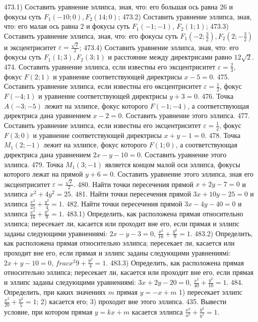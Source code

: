 473.1) Составить уравнение эллипса, зная, что: его большая ось равна 26 и фокусы суть $F_1(-10 ; 0), F_2(14 ; 0)$;
473.2) Составить уравнение эллипса, зная, что: его малая ось равна 2 и фокусы суть $F_1(-1 ;-1)$, $F_2(1 ; 1)$;
473.3) Составить уравнение эллипса, зная, что: его фокусы суть $F_1\left(-2 ; \frac{3}{2}\right), F_2\left(2 ;-\frac{3}{2}\right)$ и эксцентриситет $\varepsilon=\frac{\sqrt{2}}{2}$;
473.4) Составить уравнение эллипса, зная, что: его фокусы суть $F_1(1 ; 3), F_2(3 ; 1)$ и расстояние между директрисами равно $12 \sqrt{2}$.
474. Составить уравнение эллипса, єсли известны его эксцентриситет $\varepsilon=\frac{2}{3}$, фокус $F(2 ; 1)$ и уравнение соответствующей директрисы $x-5=0$.
475. Составить уравнение эллипса, если известны его өксцентриситет $\varepsilon=\frac{1}{2}$, фокус $F(-4 ; 1)$ и уравнение соответствующей директрисы $y+3=0$.
476. Точка $A(-3 ;-5)$ лежит на эллипсе, фокус которого $F(-1 ;-4)$, а соответствующая директриса дана уравнением $x-2=0$. Составить уравнение этого эллипса.
477. Составить уравнение эллипса, если известны его эксцентриситет $\varepsilon=\frac{1}{2}$, фокус $F(3 ; 0)$ и уравнение соответствующей директрисы $x+y-1=0$.
478. Точка $M_1(2 ;-1)$ лежит на эллипсе, фокус которого $F(1 ; 0)$, а соответствующая директриса дана уравнением $2 x-y-10=0$. Составить уравнение этого эллипса.
479. Точка $M_1(3 ;-1)$ является концом малой оси эллипса, фокусы которого лежат на прямой $y+6=0$. Составить уравнение этого эллипса, зная его эксцентриситет $\varepsilon=\frac{\sqrt{2}}{2}$.
480. Найти точки пересечения прямой $x+2 y-7=0$ и эллипса $x^2+4 y^2=25$.
481. Найти точки пересечения прямой $3 x+10 y-25=0$ и эллипса $\frac{x^2}{25}+\frac{y^2}{4}=1$.
482. Найти точки пересечения прямой $3 x-4 y-40=0$ и эллипса $\frac{x^2}{16}+\frac{y^2}{9}=1$.
483.1) Определить, как расположена прямая относительно эллипса; пересекает ли, касается или проходит вне его, если прямая и эллипс заданы следующими уравнениямі: $2 x-y-3=0$, $\frac{x^2}{16}+\frac{y^2}{9}=1$.
483.2) Определить, как расположена прямая относительно эллипса; пересекает ли, касается или проходит вне его, если прямая и эллипс заданы следующими уравнениямі: $2 x+y-10=0$, $frac{x^2}{9}+\frac{y^2}{4}=1$.
483.3) Определить, как расположена прямая относительно эллипса; пересекает ли, касается или проходит вне его, если прямая и эллипс заданы следующими уравнениямі: $3 x+2 y-20=0$, $\frac{x^2}{40}+\frac{y^2}{10}=1$.
484. Определить, при каких значениях $m$ прямая $y=-x+m$ 1) пересекает эллипс $\frac{x^2}{20}+\frac{y^2}{5}=1$; 2) касается его; 3) проходит вне этого эллипса.
435. Вывести условие, при котором прямая $y=k x+m$ касается эллипса $\frac{x^2}{a^2}+\frac{y^2}{b^2}=1$.
